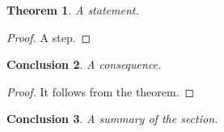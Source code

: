 \documentclass{article}
\newtheorem{theorem}{Theorem}
\newtheorem{conclusion}[theorem]{Conclusion}
\begin{document}
\begin{theorem}
A statement.
\end{theorem}
\begin{proof}
A step.
\end{proof}
\begin{conclusion}
A consequence.
\end{conclusion}
\begin{proof}
It follows from the theorem.
\end{proof}
\begin{conclusion}
A summary of the section.
\end{conclusion}
\end{document}
